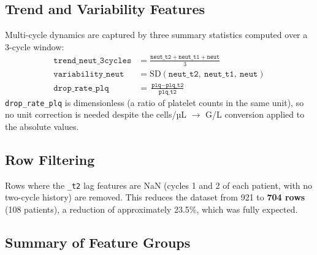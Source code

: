 \documentclass[12pt,a4paper]{report}
\begin{document}
\subsection{Trend and Variability Features}

Multi-cycle dynamics are captured by three summary statistics computed over a 3-cycle window:
\begin{align}
  \texttt{trend\_neut\_3cycles} &= \frac{\texttt{neut\_t2} + \texttt{neut\_t1} + \texttt{neut}}{3} \\
  \texttt{variability\_neut}    &= \text{SD}(\texttt{neut\_t2},\ \texttt{neut\_t1},\ \texttt{neut}) \\
  \texttt{drop\_rate\_plq}      &= \frac{\texttt{plq} - \texttt{plq\_t2}}{\texttt{plq\_t2}}
\end{align}
\texttt{drop\_rate\_plq} is dimensionless (a ratio of platelet counts in the same unit), so no unit correction is needed despite the cells/µL $\to$ G/L conversion applied to the absolute values.

\subsection{Row Filtering}

Rows where the \texttt{\_t2} lag features are NaN (cycles 1 and 2 of each patient, with no two-cycle history) are removed. This reduces the dataset from 921 to \textbf{704 rows} (108 patients), a reduction of approximately 23.5\%, which was fully expected.

\subsection{Summary of Feature Groups}
\end{document}
